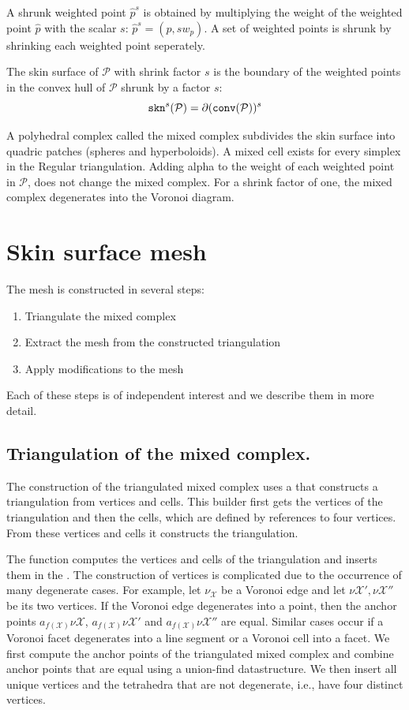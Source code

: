 A shrunk weighted point ${\hat{p}}^{s}$ is obtained by multiplying the
weight of the weighted point ${\hat{p}}$ with the scalar $s$:
${\hat{p}}^{s}= (p,s w_p)$. A set of weighted points is shrunk by
shrinking each weighted point seperately.

The skin surface of ${\mathcal{P}}$ with shrink factor $s$ is the boundary
of the weighted points in the convex hull of $\mathcal{P}$ shrunk by a
factor $s$:
\[{\tt skn}^s(\mathcal{P}) =
\partial({\tt conv}(\mathcal{P}))^s\]

A polyhedral complex called the mixed complex subdivides the skin
surface into quadric patches (spheres and hyperboloids). A mixed cell
exists for every simplex in the Regular triangulation. Adding alpha to
the weight of each weighted point in $\mathcal{P}$, does not change the
mixed complex. For a shrink factor of one, the mixed complex
degenerates into the Voronoi diagram.

\section{Skin surface mesh}
The mesh is constructed in several steps:
\begin{enumerate}
\item Triangulate the mixed complex
\item Extract the mesh from the constructed triangulation
\item Apply modifications to the mesh
\end{enumerate}
Each of these steps is of independent interest and we describe them in
more detail.

\subsection{Triangulation of the mixed complex.}
The construction of the triangulated mixed complex uses a
 that constructs a
triangulation from vertices and cells. This builder first gets the
vertices of the triangulation and then the cells, which are defined by
references to four vertices. From these vertices and cells it
constructs the triangulation.

The function  computes the vertices
and cells of the triangulation and inserts them in the
. The construction of
vertices is complicated due to the occurrence of many degenerate
cases.  For example, let $\nu_{\mathcal{X}}$ be a Voronoi edge and
let $\nu{\mathcal{X}'}, \nu{\mathcal{X}''}$ be its two vertices.
If the Voronoi edge degenerates into a point, then the anchor points
$a_{f({\mathcal{X}})}{\nu{\mathcal{X}}}$,
$a_{f({\mathcal{X}})}{\nu{\mathcal{X}'}}$ and
$a_{f({\mathcal{X}})}{\nu{\mathcal{X}''}}$ are equal. Similar
cases occur if a Voronoi facet degenerates into a line segment or a
Voronoi cell into a facet. We first compute the anchor points of the
triangulated mixed complex and combine anchor points that are equal
using a union-find datastructure. We then insert all unique vertices
and the tetrahedra that are not degenerate, i.e., have four distinct
vertices.


